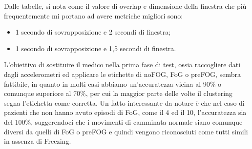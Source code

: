 Dalle tabelle, si nota come il valore di overlap e dimensione della finestra che più frequentemente mi portano ad avere metriche migliori sono:
\begin{itemize}
	\item 1 secondo di sovrapposizione e 2 secondi di finestra;
	\item 1 secondo di sovrapposizione e 1,5 secondi di finestra.
\end{itemize}
L'obiettivo di sostituire il medico nella prima fase di test, ossia raccogliere dati dagli accelerometri ed applicare le etichette di noFOG, FoG o preFOG, sembra fattibile, in quanto in molti casi abbiamo un'accuratezza vicina al 90\% o comunque superiore al 70\%, per cui la maggior parte delle volte il clustering segna l'etichetta come corretta. Un fatto interessante da notare è che nel caso di pazienti che non hanno avuto episodi di FoG, come il 4 ed il 10, l'accuratezza sia del 100\%, suggerendoci che i movimenti di camminata normale siano comunque diversi da quelli di FoG o preFOG e quindi vengono riconosciuti come tutti simili in assenza di Freezing.\\
